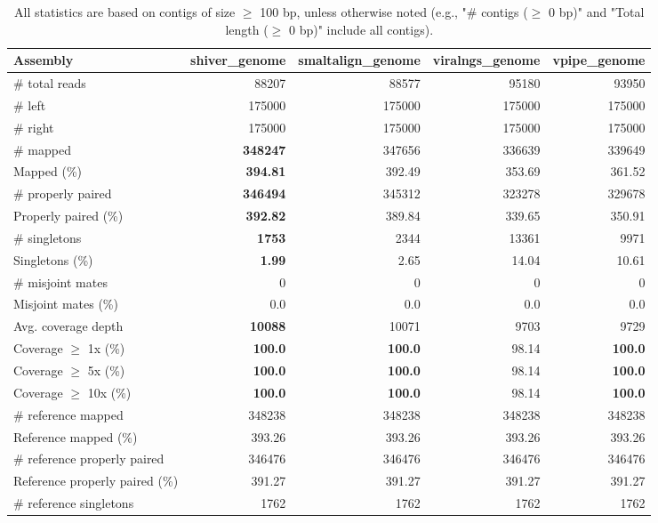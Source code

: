 \documentclass[12pt,a4paper]{article}
\begin{document}
\begin{table}[ht]
\begin{center}
\caption{All statistics are based on contigs of size $\geq$ 100 bp, unless otherwise noted (e.g., "\# contigs ($\geq$ 0 bp)" and "Total length ($\geq$ 0 bp)" include all contigs).}
\begin{tabular}{|l*{4}{|r}|}
\hline
Assembly & shiver\_genome & smaltalign\_genome & viralngs\_genome & vpipe\_genome \\ \hline
\# total reads & 88207 & 88577 & 95180 & 93950 \\ \hline
\# left & 175000 & 175000 & 175000 & 175000 \\ \hline
\# right & 175000 & 175000 & 175000 & 175000 \\ \hline
\# mapped & {\bf 348247} & 347656 & 336639 & 339649 \\ \hline
Mapped (\%) & {\bf 394.81} & 392.49 & 353.69 & 361.52 \\ \hline
\# properly paired & {\bf 346494} & 345312 & 323278 & 329678 \\ \hline
Properly paired (\%) & {\bf 392.82} & 389.84 & 339.65 & 350.91 \\ \hline
\# singletons & {\bf 1753} & 2344 & 13361 & 9971 \\ \hline
Singletons (\%) & {\bf 1.99} & 2.65 & 14.04 & 10.61 \\ \hline
\# misjoint mates & 0 & 0 & 0 & 0 \\ \hline
Misjoint mates (\%) & 0.0 & 0.0 & 0.0 & 0.0 \\ \hline
Avg. coverage depth & {\bf 10088} & 10071 & 9703 & 9729 \\ \hline
Coverage $\geq$ 1x (\%) & {\bf 100.0} & {\bf 100.0} & 98.14 & {\bf 100.0} \\ \hline
Coverage $\geq$ 5x (\%) & {\bf 100.0} & {\bf 100.0} & 98.14 & {\bf 100.0} \\ \hline
Coverage $\geq$ 10x (\%) & {\bf 100.0} & {\bf 100.0} & 98.14 & {\bf 100.0} \\ \hline
\# reference mapped & 348238 & 348238 & 348238 & 348238 \\ \hline
Reference mapped (\%) & 393.26 & 393.26 & 393.26 & 393.26 \\ \hline
\# reference properly paired & 346476 & 346476 & 346476 & 346476 \\ \hline
Reference properly paired (\%) & 391.27 & 391.27 & 391.27 & 391.27 \\ \hline
\# reference singletons & 1762 & 1762 & 1762 & 1762 \\ \hline

\end{tabular}
\end{center}
\end{table}
\end{document}

